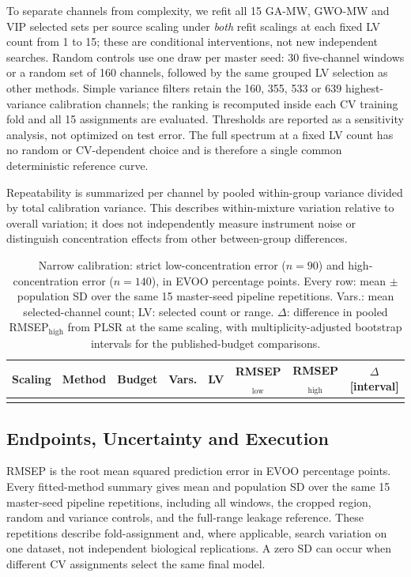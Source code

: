 To separate channels from complexity, we refit all 15 GA-MW, GWO-MW and VIP selected sets per source scaling under \emph{both} refit scalings at each fixed LV count from 1 to 15; these are conditional interventions, not new independent searches. Random controls use one draw per master seed: 30 five-channel windows or a random set of 160 channels, followed by the same grouped LV selection as other methods. Simple variance filters retain the 160, 355, 533 or 639 highest-variance calibration channels; the ranking is recomputed inside each CV training fold and all 15 assignments are evaluated. Thresholds are reported as a sensitivity analysis, not optimized on test error. The full spectrum at a fixed LV count has no random or CV-dependent choice and is therefore a single common deterministic reference curve.

Repeatability is summarized per channel by pooled within-group variance divided by total calibration variance. This describes within-mixture variation relative to overall variation; it does not independently measure instrument noise or distinguish concentration effects from other between-group differences.

\begin{table}[!t]
\caption{Narrow calibration: strict low-concentration error ($n=90$) and high-concentration error ($n=140$), in EVOO percentage points. Every row: mean $\pm$ population SD over the same 15 master-seed pipeline repetitions. Vars.: mean selected-channel count; LV: selected count or range. $\Delta$: difference in pooled RMSEP$_{\mathrm{high}}$ from PLSR at the same scaling, with multiplicity-adjusted bootstrap intervals for the published-budget comparisons.}
\label{tab:main}
\centering\footnotesize
\setlength{\tabcolsep}{4pt}
\begin{tabular}{@{}lllrrccc@{}}
\toprule
Scaling & Method & Budget & Vars. & LV & RMSEP$_{\mathrm{low}}$ & RMSEP$_{\mathrm{high}}$ & $\Delta$ [interval]\\
\midrule
\\
\bottomrule
\end{tabular}
\end{table}

\subsection{Endpoints, Uncertainty and Execution}
RMSEP is the root mean squared prediction error in EVOO percentage points. Every fitted-method summary gives mean and population SD over the same 15 master-seed pipeline repetitions, including all windows, the cropped region, random and variance controls, and the full-range leakage reference. These repetitions describe fold-assignment and, where applicable, search variation on one dataset, not independent biological replications. A zero SD can occur when different CV assignments select the same final model.

